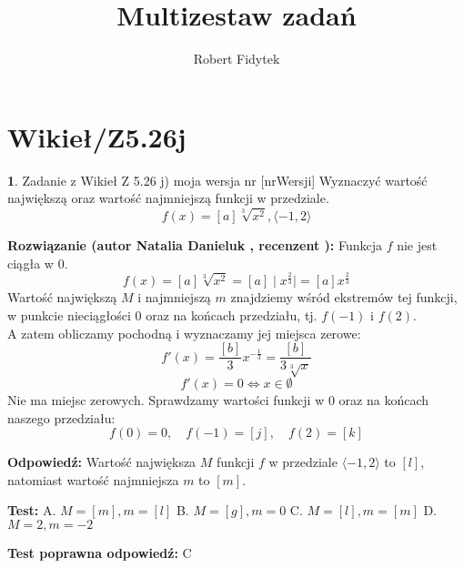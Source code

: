 \documentclass[12pt, a4paper]{article}
\title{Multizestaw zadań}
\author{Robert Fidytek}
\date{}
\theoremstyle{definition} %
\newtheorem{zad}{}
\newcommand{\kategoria}[1]{\section{#1}} %
\newcommand{\zadStart}[1]{\begin{zad}#1\newline} %
\newcommand{\zadStop}{\end{zad}}   %
\newcommand{\rozwStart}[2]{\noindent \textbf{Rozwiązanie (autor #1 , recenzent #2): }\newline} %
\newcommand{\rozwStop}{\newline}                                            %
\newcommand{\odpStart}{\noindent \textbf{Odpowiedź:}\newline}    %
\newcommand{\odpStop}{\newline}                                             %
\newcommand{\testStart}{\noindent \textbf{Test:}\newline} %
\newcommand{\testStop}{\newline} %
\newcommand{\kluczStart}{\noindent \textbf{Test poprawna odpowiedź:}\newline} %
\newcommand{\kluczStop}{\newline} %
\begin{document}
\maketitle

\kategoria{Wikieł/Z5.26j}

\zadStart{Zadanie z Wikieł Z 5.26 j) moja wersja nr [nrWersji]}
Wyznaczyć wartość największą oraz wartość najmniejszą funkcji w przedziale. 
$$f(x) = [a]\sqrt[3]{x^2 }, \langle-1,2\rangle$$
\zadStop

\rozwStart{Natalia Danieluk}{}
Funkcja $f$ nie jest ciągła w $0$. 
$$ f(x) = [a]\sqrt[3]{x^2} = [a]\mid x^{\frac{2}{3}} \mid = [a]x^{\frac{2}{3}} $$
Wartość największą $M$ i najmniejszą $m$ znajdziemy wśród ekstremów tej funkcji, w punkcie nieciągłości $0$ oraz na końcach przedziału, tj. $f(-1)$ i $f(2)$. \\
A zatem obliczamy pochodną i wyznaczamy jej miejsca zerowe:
$$ f'(x) =  \frac{[b]}{3}x^{-\frac{1}{3}} =  \frac{[b]}{3\sqrt[3]{x}} $$
$$ f'(x) = 0 \Leftrightarrow x \in \emptyset $$ 
Nie ma miejsc zerowych. Sprawdzamy wartości funkcji w $0$ oraz na końcach naszego przedziału: \\
$$ f(0) = 0,\quad f(-1) = [j],\quad f(2) = [k] $$
\rozwStop

\odpStart
Wartość największa $M$ funkcji $f$ w przedziale $\langle-1,2\rangle$ to $[l]$, natomiast wartość najmniejsza $m$ to $[m]$.
\odpStop

\testStart
A. $M=[m], m=[l]$
B. $M=[g], m=0$
C. $M=[l], m=[m]$
D. $M=2, m=-2$
\testStop

\kluczStart
C
\kluczStop
\end{document}
